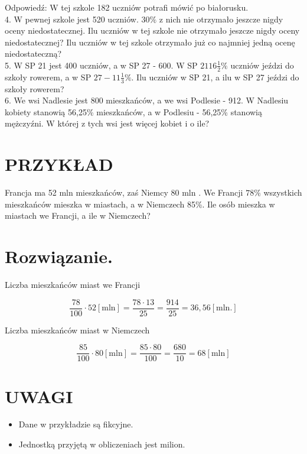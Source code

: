 \documentclass[10pt]{article}
\begin{document}
Odpowiedź: W tej szkole 182 uczniów potrafi mówić po białorusku.\\
4. W pewnej szkole jest 520 uczniów. \(30 \%\) z nich nie otrzymało jeszcze nigdy oceny niedostatecznej. Ilu uczniów w tej szkole nie otrzymało jeszcze nigdy oceny niedostatecznej? Ilu uczniów w tej szkole otrzymało już co najmniej jedną ocenę niedostateczną?\\
5. W SP 21 jest 400 uczniów, a w SP 27 - 600. W SP \(2116 \frac{1}{2} \%\) uczniów jeździ do szkoły rowerem, a w SP \(27-11 \frac{1}{3} \%\). Ilu uczniów w SP 21, a ilu w SP 27 jeździ do szkoły rowerem?\\
6. We wsi Nadlesie jest 800 mieszkańców, a we wsi Podlesie - 912. W Nadlesiu kobiety stanowią 56,25\% mieszkańców, a w Podlesiu - 56,25\% stanowią mężczyźni. W której z tych wsi jest więcej kobiet i o ile?

\section*{PRZYKŁAD}
Francja ma 52 mln mieszkańców, zaś Niemcy 80 mln . We Francji \(78 \%\) wszystkich mieszkańców mieszka w miastach, a w Niemczech 85\%. Ile osób mieszka w miastach we Francji, a ile w Niemczech?

\section*{Rozwiązanie.}
Liczba mieszkańców miast we Francji

\[
\frac{78}{100} \cdot 52[\mathrm{mln}]=\frac{78 \cdot 13}{25}=\frac{914}{25}=36,56[\mathrm{mln} .]
\]

Liczba mieszkańców miast w Niemczech

\[
\frac{85}{100} \cdot 80[\mathrm{mln}]=\frac{85 \cdot 80}{100}=\frac{680}{10}=68[\mathrm{mln}]
\]

\section*{UWAGI}
\begin{itemize}
  \item Dane w przykładzie są fikcyjne.
  \item Jednostką przyjętą w obliczeniach jest milion.
\end{itemize}
\end{document}
